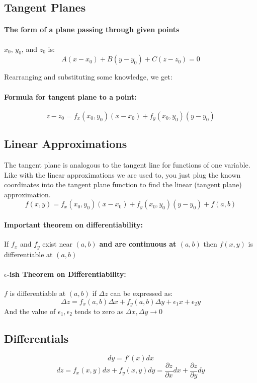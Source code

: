\documentclass[a4paper,12pt]{report}
\begin{document}
\subsection{Tangent Planes}
\paragraph{The form of a plane passing through given points } $x_0$, $y_0$, and $z_0$ is:
$$A(x-x_0) + B(y-y_0) + C(z-z_0) = 0$$

Rearranging and substituting some knowledge, we get:
\paragraph{Formula for tangent plane to a point: }
$$z - z_0 = f_{x}(x_0, y_0) (x-x_0) + f_y(x_0, y_0)(y-y_0)$$

\subsection{Linear Approximations}
The tangent plane is analogous to the tangent line for functions of one variable. Like with the linear approximations we are used to, you just plug the known coordinates into the tangent plane function to find the linear (tangent plane) approximation.
$$f(x, y) = f_{x}(x_0, y_0)(x-x_0) + f_y(x_0, y_0)(y-y_0) + f(a, b)$$

\paragraph{Important theorem on differentiability: } If $f_x$ and $f_y$ exist near $(a, b)$ \textbf{and are continuous at $(a, b)$} then $f(x, y)$ is differentiable at $(a, b)$

\paragraph{$\epsilon$-ish Theorem on Differentiability: } $f$ is differentiable at $(a, b)$ if $\Delta z$ can be expressed as: 
$$ \Delta z = f_x(a, b)\Delta x + f_y(a, b)\Delta y + \epsilon_1x + \epsilon_2y$$
And the value of $\epsilon_1, \epsilon_2$ tends to zero as $\Delta x, \Delta y \to 0$

\subsection{Differentials}
$$dy = f'(x) dx$$
$$dz = f_x(x, y)dx + f_y(x, y)dy = \frac{\partial z}{\partial x} dx + \frac{\partial z}{\partial y}dy$$
\end{document}
